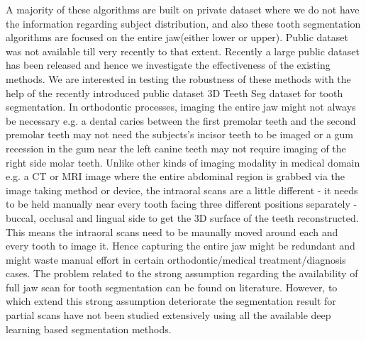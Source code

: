 \documentclass[letterpaper, 10 pt, conference]{ieeeconf}  %
\begin{document}
A majority of these algorithms are built on private dataset where we do not have the information regarding subject distribution, and also these tooth segmentation algorithms are focused on the entire jaw(either lower or upper). Public dataset was not available till very recently to that extent. Recently a large public dataset has been released and hence we investigate the effectiveness of the existing methods. We are interested in testing the robustness of these methods with the help of the recently introduced public dataset 3D Teeth Seg dataset\cite{ben2022teeth3ds} for tooth segmentation. In orthodontic processes, imaging the entire jaw might not always be necessary e.g. a dental caries between the first premolar teeth and the second premolar teeth may not need the subjects's incisor teeth to be imaged or a gum recession in the gum near the left canine teeth may not require imaging of the right side molar teeth. 
Unlike other kinds of imaging modality in medical domain e.g. a CT or MRI image where the entire abdominal region is grabbed via the image taking method or device, the intraoral scans are a little different - it needs to be held manually near every tooth facing three different positions separately - buccal, occlusal and lingual side to get the 3D surface of the teeth reconstructed. This means the intraoral scans need to be maunally moved around each and every tooth to image it. Hence capturing the entire jaw might be redundant and might waste manual effort in certain orthodontic/medical treatment/diagnosis cases. The problem related to the strong assumption regarding the availability of full jaw scan for tooth segmentation can be found on literature. However, to which extend this strong assumption deteriorate the segmentation result for partial scans have not been studied extensively using all the available deep learning based segmentation methods. 
\end{document}
